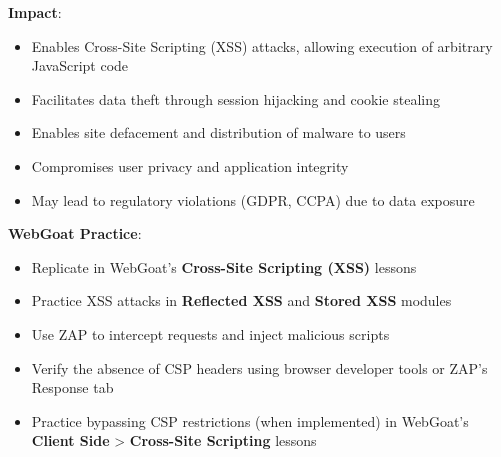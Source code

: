 \documentclass[]{UCD_CS_FYP_Report}
\begin{document}


\textbf{Impact}:
\begin{itemize}
    \item Enables Cross-Site Scripting (XSS) attacks, allowing execution of arbitrary JavaScript code
    \item Facilitates data theft through session hijacking and cookie stealing
    \item Enables site defacement and distribution of malware to users
    \item Compromises user privacy and application integrity
    \item May lead to regulatory violations (GDPR, CCPA) due to data exposure
\end{itemize}

\textbf{WebGoat Practice}:
\begin{itemize}
    \item Replicate in WebGoat's \textbf{Cross-Site Scripting (XSS)} lessons
    \item Practice XSS attacks in \textbf{Reflected XSS} and \textbf{Stored XSS} modules
    \item Use ZAP to intercept requests and inject malicious scripts
    \item Verify the absence of CSP headers using browser developer tools or ZAP's Response tab
    \item Practice bypassing CSP restrictions (when implemented) in WebGoat's \textbf{Client Side} > \textbf{Cross-Site Scripting} lessons
\end{itemize}
\end{document}
